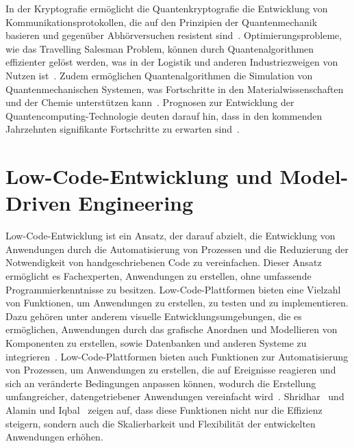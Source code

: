 In der Kryptografie ermöglicht die Quantenkryptografie die Entwicklung von Kommunikationsprotokollen, die auf den Prinzipien der 
Quantenmechanik basieren und gegenüber Abhörversuchen resistent sind~\cite{bennett2014quantum}. 
Optimierungsprobleme, wie das Travelling Salesman Problem, können durch Quantenalgorithmen effizienter 
gelöst werden, was in der Logistik und anderen Industriezweigen von Nutzen ist~\cite{farhi2000quantum}. 
Zudem ermöglichen Quantenalgorithmen die Simulation von Quantenmechanischen Systemen, was Fortschritte 
in den Materialwissenschaften und der Chemie unterstützen kann~\cite{aspuru2005simulated}. Prognosen zur Entwicklung der Quantencomputing-Technologie 
deuten darauf hin, dass in den kommenden Jahrzehnten signifikante Fortschritte zu erwarten sind~\cite{ladd2010quantum}.

\section{Low-Code-Entwicklung und Model-Driven Engineering}
Low-Code-Entwicklung ist ein Ansatz, der darauf abzielt, die Entwicklung von Anwendungen 
durch die Automatisierung von Prozessen und die Reduzierung der Notwendigkeit von 
handgeschriebenen Code zu vereinfachen. Dieser Ansatz ermöglicht es Fachexperten, Anwendungen 
zu erstellen, ohne umfassende Programmierkenntnisse zu besitzen. Low-Code-Plattformen 
bieten eine Vielzahl von Funktionen, um Anwendungen zu erstellen, zu 
testen und zu implementieren. Dazu gehören unter anderem visuelle Entwicklungsumgebungen, 
die es ermöglichen, Anwendungen durch das grafische Anordnen und Modellieren von Komponenten zu erstellen, 
sowie Datenbanken und anderen Systeme zu integrieren~\cite{Bock_2021}. 
Low-Code-Plattformen bieten auch Funktionen zur Automatisierung von Prozessen, um Anwendungen zu 
erstellen, die auf Ereignisse reagieren und sich an veränderte Bedingungen anpassen können, 
wodurch die Erstellung umfangreicher, datengetriebener Anwendungen vereinfacht wird~\cite{Bock_2021}. 
Shridhar~\cite{Shridhar_2021} und Alamin und Iqbal~\cite{Alamin_2021} zeigen auf, dass diese 
Funktionen nicht nur die Effizienz steigern, sondern auch die Skalierbarkeit und Flexibilität 
der entwickelten Anwendungen erhöhen.

